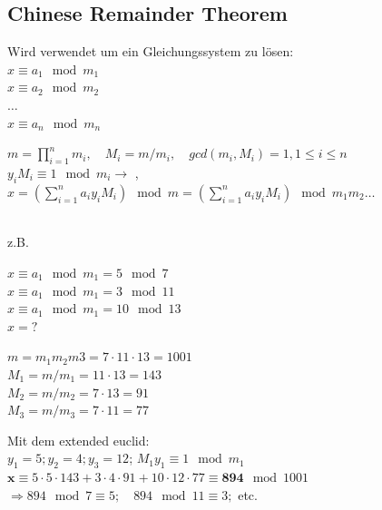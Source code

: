 \subsection{Chinese Remainder Theorem}
\begin{minipage}{8cm}
Wird verwendet um ein Gleichungssystem zu l\"osen: \\
$x \equiv a_1 \mod m_1$\\
$x \equiv a_2 \mod m_2$\\
$\ldots$\\
$x \equiv a_n \mod m_n$\\
\end{minipage}
\begin{minipage}{9cm}
$m=\displaystyle\prod_{i=1}^{n} m_i, \quad M_i=m/m_i, \quad gcd(m_i, M_i)=1, 1 \leq i \leq n$\\
$y_iM_i \equiv 1 \mod m_i \to$ , \\
$x=\left(\displaystyle\sum_{i=1}^{n} a_i  y_i M_i \right) \mod m=\left(\displaystyle\sum_{i=1}^{n} a_i  y_i M_i \right) \mod m_1 m_2 \ldots $
\end{minipage}\\
z.B.\\
\begin{minipage}{5cm}
$x\equiv a_1 \mod m_1 = 5  \mod 7$\\
$x\equiv a_1 \mod m_1 = 3  \mod 11$\\
$x\equiv a_1 \mod m_1 = 10 \mod 13$\\
$x=?$
\end{minipage}
\begin{minipage}{5cm}
$m=m_1 m_2 m3 = 7\cdot 11 \cdot 13 = 1001$\\
$M_1=m/m_1=11 \cdot 13 = 143$\\
$M_2=m/m_2=7 \cdot 13 = 91$\\
$M_3=m/m_3=7 \cdot 11 = 77$\\
\end{minipage}
\begin{minipage}{8cm}
Mit dem extended euclid: \\
$y_1=5;  y_2=4; y_3=12$; $M_1 y_1 \equiv 1 \mod m_1$\\
$\bm x\equiv 5\cdot5\cdot143+3\cdot4\cdot91+10\cdot12\cdot77 \equiv \bm{894} \mod 1001$\\
$\Rightarrow 894 \mod 7 \equiv 5; \quad 894 \mod 11 \equiv 3;$ etc.
\end{minipage}

